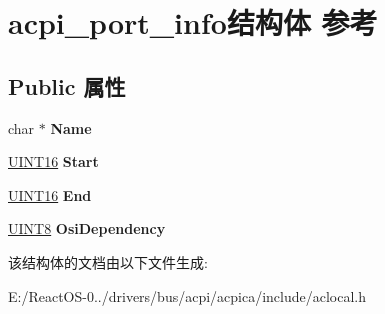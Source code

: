 \hypertarget{structacpi__port__info}{}\section{acpi\+\_\+port\+\_\+info结构体 参考}
\label{structacpi__port__info}
\subsection*{Public 属性}
\begin{DoxyCompactItemize}
\item 
\mbox{\label{structacpi__port__info_a4493489ea529aa594e968cdf97c86884}} 
char $\ast$ {\bfseries Name}
\item 
\mbox{\label{structacpi__port__info_aecdc0dc971a34246e7865cc5c050e181}} 
\hyperlink{_processor_bind_8h_a09f1a1fb2293e33483cc8d44aefb1eb1}{U\+I\+N\+T16} {\bfseries Start}
\item 
\mbox{\label{structacpi__port__info_a7f895b196cd86b1890a46b43a9bc55ee}} 
\hyperlink{_processor_bind_8h_a09f1a1fb2293e33483cc8d44aefb1eb1}{U\+I\+N\+T16} {\bfseries End}
\item 
\mbox{\label{structacpi__port__info_abc64053b834fa24df5132a8659297239}} 
\hyperlink{_processor_bind_8h_ab27e9918b538ce9d8ca692479b375b6a}{U\+I\+N\+T8} {\bfseries Osi\+Dependency}
\end{DoxyCompactItemize}


该结构体的文档由以下文件生成\+:\begin{DoxyCompactItemize}
\item 
E\+:/\+React\+O\+S-\/0../drivers/bus/acpi/acpica/include/aclocal.\+h\end{DoxyCompactItemize}
